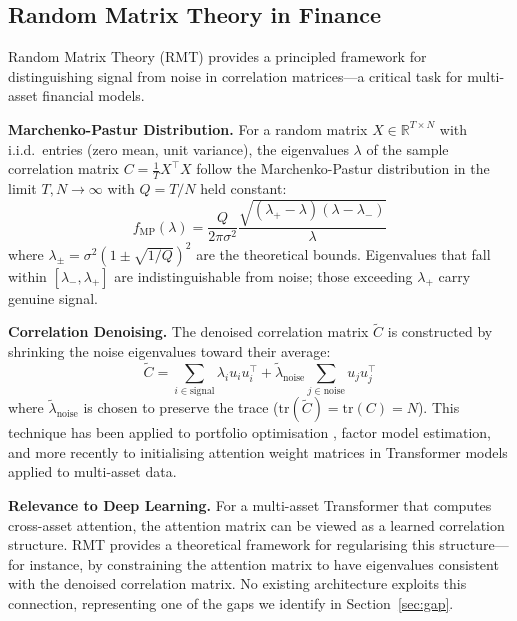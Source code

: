 \documentclass[conference]{IEEEtran}
\begin{document}
\subsection{Random Matrix Theory in Finance}

Random Matrix Theory (RMT) provides a principled framework for distinguishing signal from noise in correlation matrices---a critical task for multi-asset financial models.

\textbf{Marchenko-Pastur Distribution.} For a random matrix $X \in \mathbb{R}^{T \times N}$ with i.i.d.\ entries (zero mean, unit variance), the eigenvalues $\lambda$ of the sample correlation matrix $C = \frac{1}{T} X^\top X$ follow the Marchenko-Pastur distribution \cite{marchenko1967distribution} in the limit $T, N \to \infty$ with $Q = T/N$ held constant:
\begin{equation}
f_{\text{MP}}(\lambda) = \frac{Q}{2\pi\sigma^2} \frac{\sqrt{(\lambda_+ - \lambda)(\lambda - \lambda_-)}}{\lambda}
\end{equation}
where $\lambda_{\pm} = \sigma^2(1 \pm \sqrt{1/Q})^2$ are the theoretical bounds. Eigenvalues that fall within $[\lambda_-, \lambda_+]$ are indistinguishable from noise; those exceeding $\lambda_+$ carry genuine signal.

\textbf{Correlation Denoising.} The denoised correlation matrix $\tilde{C}$ is constructed by shrinking the noise eigenvalues toward their average:
\begin{equation}
\tilde{C} = \sum_{i \in \text{signal}} \lambda_i u_i u_i^\top + \tilde{\lambda}_{\text{noise}} \sum_{j \in \text{noise}} u_j u_j^\top
\end{equation}
where $\tilde{\lambda}_{\text{noise}}$ is chosen to preserve the trace ($\text{tr}(\tilde{C}) = \text{tr}(C) = N$). This technique has been applied to portfolio optimisation \cite{laloux2000random, bun2017cleaning}, factor model estimation, and more recently to initialising attention weight matrices in Transformer models applied to multi-asset data.

\textbf{Relevance to Deep Learning.} For a multi-asset Transformer that computes cross-asset attention, the attention matrix can be viewed as a learned correlation structure. RMT provides a theoretical framework for regularising this structure---for instance, by constraining the attention matrix to have eigenvalues consistent with the denoised correlation matrix. No existing architecture exploits this connection, representing one of the gaps we identify in Section~\ref{sec:gap}.
\end{document}
